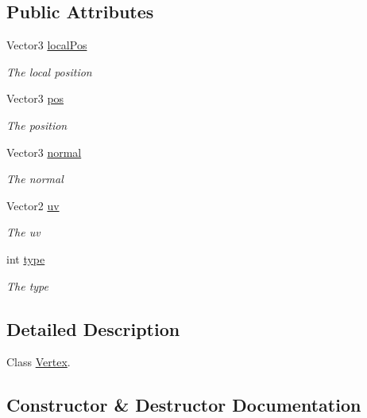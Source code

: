 \subsection*{Public Attributes}
\begin{DoxyCompactItemize}
\item 
Vector3 \hyperlink{class_lerp2_a_p_i_1_1_utility_1_1_c_s_g_1_1_triangulation_1_1_vertex_aead8d0294c8e7e587d732c4a29ada389}{local\+Pos}
\begin{DoxyCompactList}\small\item\em The local position \end{DoxyCompactList}\item 
Vector3 \hyperlink{class_lerp2_a_p_i_1_1_utility_1_1_c_s_g_1_1_triangulation_1_1_vertex_a46d2c101e884a9250a28c14d83a4c8a8}{pos}
\begin{DoxyCompactList}\small\item\em The position \end{DoxyCompactList}\item 
Vector3 \hyperlink{class_lerp2_a_p_i_1_1_utility_1_1_c_s_g_1_1_triangulation_1_1_vertex_a861959cd7695844f311d4d487902ec55}{normal}
\begin{DoxyCompactList}\small\item\em The normal \end{DoxyCompactList}\item 
Vector2 \hyperlink{class_lerp2_a_p_i_1_1_utility_1_1_c_s_g_1_1_triangulation_1_1_vertex_adfd4c78b3837a6c55e6edf9f1ea3176d}{uv}
\begin{DoxyCompactList}\small\item\em The uv \end{DoxyCompactList}\item 
int \hyperlink{class_lerp2_a_p_i_1_1_utility_1_1_c_s_g_1_1_triangulation_1_1_vertex_a20f566064208ffa7af76dd8db005dbb7}{type}
\begin{DoxyCompactList}\small\item\em The type \end{DoxyCompactList}\end{DoxyCompactItemize}


\subsection{Detailed Description}
Class \hyperlink{class_lerp2_a_p_i_1_1_utility_1_1_c_s_g_1_1_triangulation_1_1_vertex}{Vertex}. 



\subsection{Constructor \& Destructor Documentation}
\mbox{\label{class_lerp2_a_p_i_1_1_utility_1_1_c_s_g_1_1_triangulation_1_1_vertex_a4927fc12e4cede66025a1ba156df0ca6}} 
